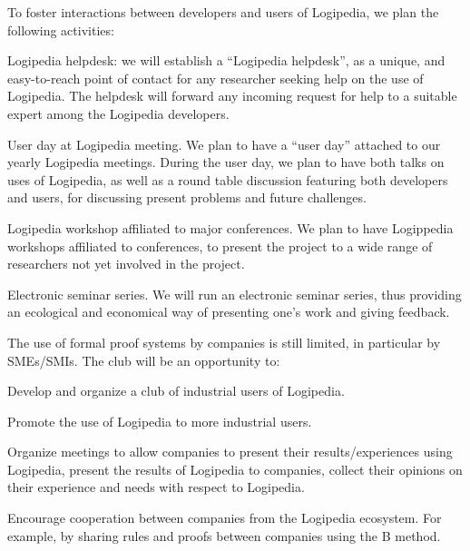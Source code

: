 \begin{workpackage}[id=dissemination,type=MGT,wphases=1-48,
  short={Dissemination},
  title={Dissemination, communication and exploitation},
  lead=Lie,LieRM=1,InrRM=6,BirRM=4,CleRM=2,ImtRM=2,StrRM=2,ZibRM=14,EduRM=12]
\begin{tasklist}
  \begin{task}[id=researchers-club,
      title=Expanding the use of Logipedia in research,
      shorttitle=Research,
      lead=Bir,BirRM=2,wphases=1-48!.05]
     To foster interactions between developers and users of Logipedia, we plan the following activities:
    \begin{compactitem}
     \item Logipedia helpdesk:
    we will establish a ``Logipedia helpdesk'', as a unique, and easy-to-reach point of contact for any researcher seeking help on the use of Logipedia.
     The helpdesk will forward any incoming request for help to a suitable expert among the Logipedia developers.
     \item User day at Logipedia meeting.
     We plan to have a ``user day'' attached to our yearly Logipedia meetings.
     During the user day, we plan to have both talks on uses of Logipedia, as well as a round table discussion featuring both developers and users, for discussing present problems and future challenges.
     \item Logipedia workshop affiliated to major conferences.
     We plan to have Logippedia workshops affiliated to conferences, to present the project to a wide range of researchers not yet involved in the project.
     \item Electronic seminar series.
     We will run an electronic seminar series, thus providing an ecological and economical way of presenting one's work and giving feedback.
    \end{compactitem}
  \end{task}

  \begin{task}[id=industrial-club,
    title=Expanding the use of Logipedia in the industry,
    shorttitle=Industry,
    lead=Cle,CleRM=2,wphases=1-48!.05]
    The use of formal proof systems by companies is still limited, in particular by SMEs/SMIs. The club will be an opportunity to:
    \begin{compactitem}
    \item Develop and organize a club of industrial users of Logipedia.
    \item Promote the use of Logipedia to more industrial users.
    \item Organize meetings to allow companies to present their results/experiences using Logipedia, present the results of Logipedia to companies, collect their opinions on their experience and needs with respect to Logipedia.
    \item Encourage cooperation between companies from the Logipedia
      ecosystem. For example, by sharing rules and proofs between companies using the B method.
    \end{compactitem}
  \end{task}


\end{tasklist}
\end{workpackage}

